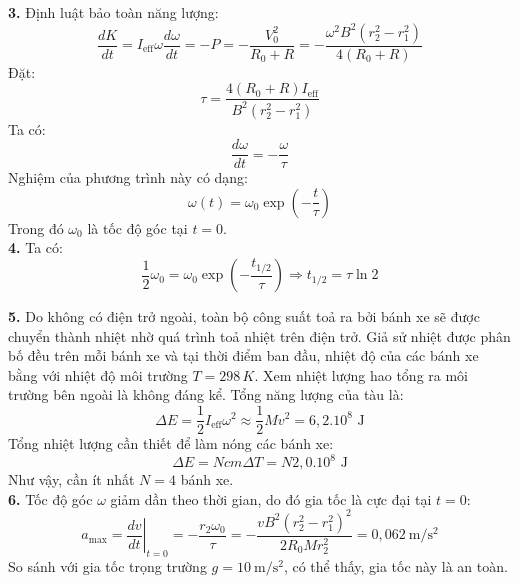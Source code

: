 \noindent\textbf{3.} Định luật bảo toàn năng lượng:
\begin{equation*}
  \frac{dK}{dt} = I_{\text{eff}} \omega \frac{d\omega}{dt} = -P = - \frac{V_0^2}{R_0 + R} = - \frac{\omega^2 B^2 (r_2^2 - r_1^2)}{4(R_0 + R)}
\end{equation*}
Đặt:
\begin{equation*}
  \tau = \frac{4 (R_0 + R) I_{\text{eff}}}{B^2 (r_2^2 - r_1^2)}
\end{equation*}
Ta có:
\begin{equation*}
  \frac{d\omega}{dt} = - \frac{\omega}{\tau}
\end{equation*}
Nghiệm của phương trình này có dạng:
\begin{equation*}
  \omega(t) = \omega_0 \exp \left( - \frac{t}{\tau} \right)
\end{equation*}
Trong đó $\omega_0$ là tốc độ góc tại $t = 0$.\\

\noindent\textbf{4.} Ta có:
\begin{equation*}
  \frac{1}{2} \omega_0 = \omega_0 \exp \left( - \frac{t_{1/2}}{\tau} \right) \Rightarrow t_{1/2} = \tau \ln 2
\end{equation*}

\noindent\textbf{5.} Do không có điện trở ngoài, toàn bộ công suất toả ra bởi bánh xe sẽ được chuyển thành nhiệt nhờ quá trình toả nhiệt trên điện trở. Giả sử nhiệt được phân bố đều trên mỗi bánh xe và tại thời điểm ban đầu, nhiệt độ của các bánh xe bằng với nhiệt độ môi trường $T = 298\,K$.
Xem nhiệt lượng hao tổng ra môi trường bên ngoài là không đáng kể. Tổng năng lượng của tàu là:
\begin{equation*}
  \Delta E = \frac{1}{2} I_{\text{eff}} \omega^2 \approx \frac{1}{2} M v^2 = 6{,}2.10^8 \text{ J}
\end{equation*}
Tổng nhiệt lượng cần thiết để làm nóng các bánh xe:
\begin{equation*}
  \Delta E = N c m \Delta T = N  2{,}0.10^8 \text{ J}
\end{equation*}
Như vậy, cần ít nhất $N = 4$ bánh xe.\\

\noindent\textbf{6.} Tốc độ góc $\omega$ giảm dần theo thời gian, do đó gia tốc là cực đại tại $t = 0$:
\begin{equation*}
  a_{\text{max}} = \left. \frac{dv}{dt} \right|_{t = 0} = -\frac{r_2 \omega_0}{\tau} = -\frac{v B^2 (r_2^2 - r_1^2)^2}{2 R_0 M r_2^2} = 0{,}062 \ \mathrm{m/s^2}
\end{equation*}
So sánh với gia tốc trọng trường $g = 10 \ \mathrm{m/s^2}$, có thể thấy, gia tốc này là an toàn.
